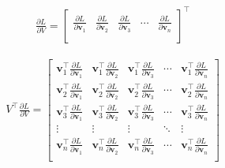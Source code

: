 \documentclass{article}
\newcommand{\bv}{\mathbf{v}}
\begin{document}
	\begin{equation}
	\begin{aligned}
	\frac{\partial L}{\partial V} = 
	\begin{bmatrix}
	\frac{\partial L}{\partial \bv_{1}} &\frac{\partial L}{\partial \bv_{2}}  &\frac{\partial L}{\partial \bv_{3}}  &\cdots &\frac{\partial L}{\partial \bv_{n}} \\
	\end{bmatrix}^{\top}
	\end{aligned}
	\end{equation}
	
	\begin{equation}
	\begin{aligned}
	V^{\top}\frac{\partial L}{\partial V} = 
	\begin{bmatrix}
	\bv_{1}^{\top}\frac{\partial L}{\partial \bv_{1}} &\bv_{1}^{\top}\frac{\partial L}{\partial \bv_{2}}  &\bv_{1}^{\top}\frac{\partial L}{\partial \bv_{3}}  &\cdots &\bv_{1}^{\top}\frac{\partial L}{\partial \bv_{n}} \\
	\bv_{2}^{\top}\frac{\partial L}{\partial \bv_{1}} &\bv_{2}^{\top}\frac{\partial L}{\partial \bv_{2}}  &\bv_{2}^{\top}\frac{\partial L}{\partial \bv_{3}}  &\cdots &\bv_{2}^{\top}\frac{\partial L}{\partial \bv_{n}} \\
	\bv_{3}^{\top}\frac{\partial L}{\partial \bv_{1}} &\bv_{3}^{\top}\frac{\partial L}{\partial \bv_{2}}  &\bv_{3}^{\top}\frac{\partial L}{\partial \bv_{3}}  &\cdots &\bv_{3}^{\top}\frac{\partial L}{\partial \bv_{n}} \\
	\vdots &\vdots &\vdots &\ddots &\vdots\\
	\bv_{n}^{\top}\frac{\partial L}{\partial \bv_{1}} &\bv_{n}^{\top}\frac{\partial L}{\partial \bv_{2}}  &\bv_{n}^{\top}\frac{\partial L}{\partial \bv_{3}}  &\cdots &\bv_{n}^{\top}\frac{\partial L}{\partial \bv_{n}} \\
	\end{bmatrix}
	\end{aligned}
	\end{equation}
	
\end{document}
